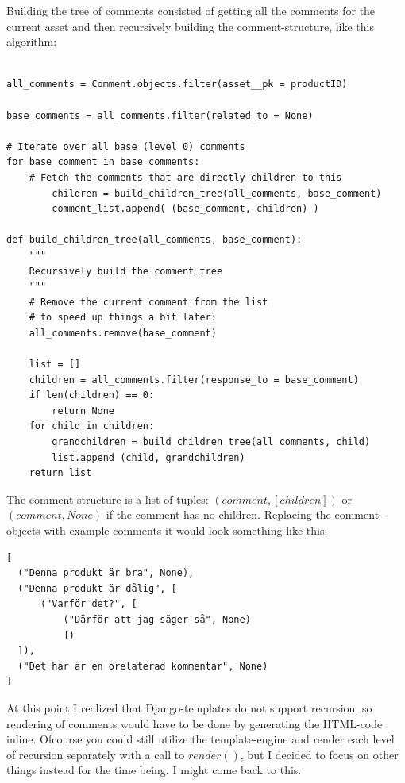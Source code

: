\documentclass[12pt, a4paper,titlepage]{article}
\begin{document}
Building the tree of comments consisted of getting all the comments for the
current asset and then recursively building the comment-structure, like this
algorithm:
\begin{lstlisting}

all_comments = Comment.objects.filter(asset__pk = productID)

base_comments = all_comments.filter(related_to = None)

# Iterate over all base (level 0) comments
for base_comment in base_comments:
	# Fetch the comments that are directly children to this
    	children = build_children_tree(all_comments, base_comment)
    	comment_list.append( (base_comment, children) )

def build_children_tree(all_comments, base_comment):
	"""
	Recursively build the comment tree
	"""
	# Remove the current comment from the list 
	# to speed up things a bit later:
	all_comments.remove(base_comment) 

	list = []
	children = all_comments.filter(response_to = base_comment)
	if len(children) == 0:
		return None
	for child in children:
		grandchildren = build_children_tree(all_comments, child)
		list.append (child, grandchildren)
	return list
\end{lstlisting}
The comment structure is a list of tuples: $(comment, [children])$ or 
$(comment, None)$ if the comment has no children.
Replacing the comment-objects with example comments it would look 
something like this:
\begin{verbatim}
[
  ("Denna produkt är bra", None),
  ("Denna produkt är dålig", [ 
      ("Varför det?", [
          ("Därför att jag säger så", None)
          ]) 
  ]),
  ("Det här är en orelaterad kommentar", None)
]
\end{verbatim}

At this point I realized that Django-templates do not support recursion, 
so rendering of comments would have to be done by generating the 
HTML-code inline. Ofcourse you could still utilize the template-engine and
render each level of recursion separately with a call to $render()$, but I decided
to focus on other things instead for the time being. I might come back to this.
\end{document}
